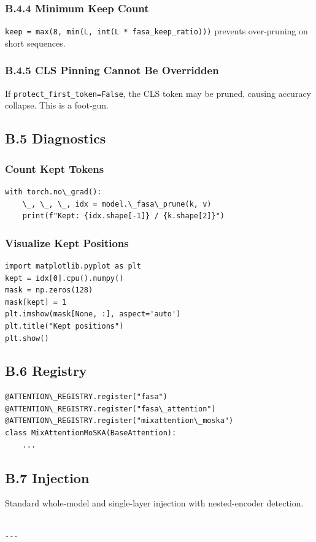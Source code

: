 \subsubsection{B.4.4 Minimum Keep Count}

\texttt{keep = max(8, min(L, int(L * fasa\_keep\_ratio)))} prevents over-pruning on 
short sequences.

\subsubsection{B.4.5 CLS Pinning Cannot Be Overridden}

If \texttt{protect\_first\_token=False}, the CLS token may be pruned, causing 
accuracy collapse. This is a foot-gun.

\subsection{B.5 Diagnostics}

\subsubsection{Count Kept Tokens}

\begin{lstlisting}
with torch.no\_grad():
    \_, \_, \_, idx = model.\_fasa\_prune(k, v)
    print(f"Kept: {idx.shape[-1]} / {k.shape[2]}")
\end{lstlisting}

\subsubsection{Visualize Kept Positions}

\begin{lstlisting}
import matplotlib.pyplot as plt
kept = idx[0].cpu().numpy()
mask = np.zeros(128)
mask[kept] = 1
plt.imshow(mask[None, :], aspect='auto')
plt.title("Kept positions")
plt.show()
\end{lstlisting}

\subsection{B.6 Registry}

\begin{lstlisting}
@ATTENTION\_REGISTRY.register("fasa")
@ATTENTION\_REGISTRY.register("fasa\_attention")
@ATTENTION\_REGISTRY.register("mixattention\_moska")
class MixAttentionMoSKA(BaseAttention):
    ...
\end{lstlisting}

\subsection{B.7 Injection}

Standard whole-model and single-layer injection with nested-encoder 
detection.
\begin{lstlisting}

---
\end{lstlisting}